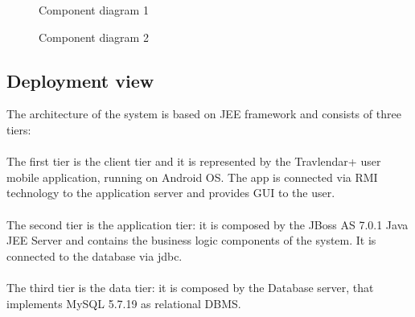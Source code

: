 \begin{figure}[H]
	\centering
	\caption{Component diagram 1}
\end{figure}
\begin{figure}[H]
	\centering
	\caption{Component diagram 2}
\end{figure}

\subsection{Deployment view}
The architecture of the system is based on JEE framework and consists of three tiers:\\\\
The first tier is the client tier and it is represented by the Travlendar+ user mobile application, running on Android OS. The app is connected via RMI technology to the application server and provides GUI to the user.\\\\
The second tier is the application tier: it is composed by the JBoss AS 7.0.1 Java JEE Server and contains the business logic components of the system. It is connected to the database via jdbc.\\\\
The third tier is the data tier: it is composed by the Database server, that implements MySQL 5.7.19 as relational DBMS.

